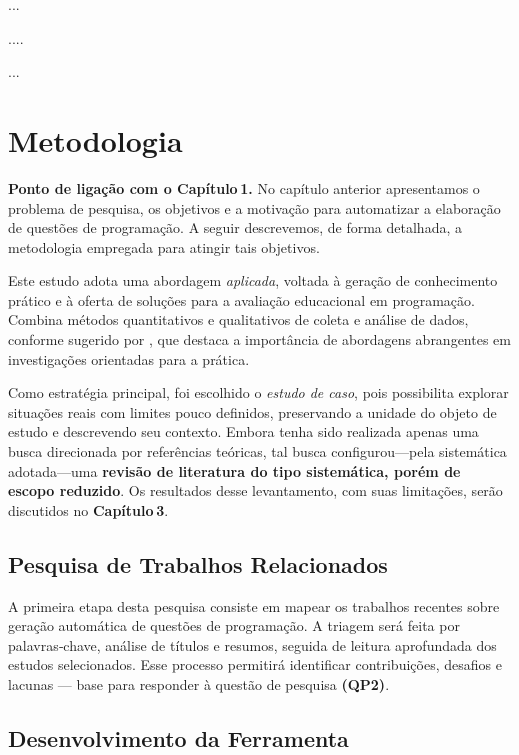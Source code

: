...



....


...



\chapter{Metodologia}\label{cap:metodologia}

\noindent
\textbf{Ponto de ligação com o Capítulo 1.}  
No capítulo anterior apresentamos o problema de pesquisa, os objetivos e a motivação para automatizar a elaboração de questões de programação. A seguir descrevemos, de forma detalhada, a metodologia empregada para atingir tais objetivos.

Este estudo adota uma abordagem \textit{aplicada}, voltada à geração de conhecimento prático e à oferta de soluções para a avaliação educacional em programação. Combina métodos quantitativos e qualitativos de coleta e análise de dados, conforme sugerido por \textcite{Gil2017}, que destaca a importância de abordagens abrangentes em investigações orientadas para a prática.  

Como estratégia principal, foi escolhido o \textit{estudo de caso}, pois possibilita explorar situações reais com limites pouco definidos, preservando a unidade do objeto de estudo e descrevendo seu contexto. Embora tenha sido realizada apenas uma busca direcionada por referências teóricas, tal busca configurou—pela sistemática adotada—uma \textbf{revisão de literatura do tipo sistemática, porém de escopo reduzido}. Os resultados desse levantamento, com suas limitações, serão discutidos no \textbf{Capítulo 3}.

\section{Pesquisa de Trabalhos Relacionados}

A primeira etapa desta pesquisa consiste em mapear os trabalhos recentes sobre geração automática de questões de programação. A triagem será feita por palavras‑chave, análise de títulos e resumos, seguida de leitura aprofundada dos estudos selecionados. Esse processo permitirá identificar contribuições, desafios e lacunas — base para responder à questão de pesquisa \textbf{(QP2)}.

\section{Desenvolvimento da Ferramenta}

